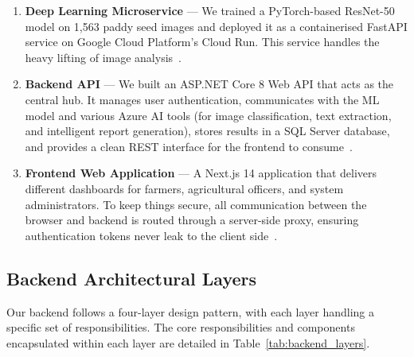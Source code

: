 \begin{enumerate}
  \item \textbf{Deep Learning Microservice} — We trained a PyTorch-based
        ResNet-50 model on 1{,}563 paddy seed images and deployed it as a
        containerised FastAPI service on Google Cloud Platform's Cloud Run. This
        service handles the heavy lifting of image analysis~\cite{he2016deep}.

  \item \textbf{Backend API} — We built an ASP.NET Core 8 Web API that acts as
        the central hub. It manages user authentication, communicates with the
        ML model and various Azure AI tools (for image classification, text
        extraction, and intelligent report generation), stores results in a SQL
        Server database, and provides a clean REST interface for the frontend to
        consume~\cite{microsoft2023aspnet}.

  \item \textbf{Frontend Web Application} — A Next.js 14 application that
        delivers different dashboards for farmers, agricultural officers, and
        system administrators. To keep things secure, all communication between
        the browser and backend is routed through a server-side proxy, ensuring
        authentication tokens never leak to the client
        side~\cite{nextjs2023docs}.
\end{enumerate}

\subsection{Backend Architectural Layers}

Our backend follows a four-layer design pattern, with each layer handling a
specific set of responsibilities. The core responsibilities and components encapsulated within each layer are detailed in Table~\ref{tab:backend_layers}.

